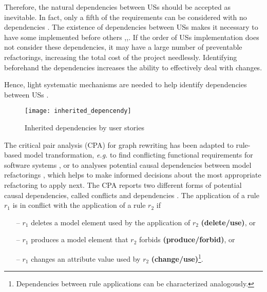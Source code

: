 Therefore, the natural dependencies between USs should be accepted as inevitable. In fact, only a fifth of the requirements can be considered with no dependencies \cite{carlshamre2001industrial}. The existence of dependencies between USs makes it necessary to have some implemented before others \cite{carlshamre2001industrial},\cite{Greer2004},\cite{logue2008handling}. If the order of USs implementation does not consider these dependencies, it may have a large number of preventable refactorings, increasing the total cost of the project needlessly. Identifying beforehand the dependencies increases the ability to effectively deal with changes. 

Hence, light systematic mechanisms are needed to help identify dependencies between USs \cite{gomez2010systematic}.
\begin{figure}
\center
\texttt{[image: inherited\_depencendy]}
\caption{  Inherited dependencies by user stories\cite{gomez2010systematic} }\label{fig:inherited_dependencies}
\end{figure}
The critical pair analysis (CPA) for graph rewriting \cite{hartmanis2006monographs} has been adapted to rule-based model transformation, \emph{e.g.} to find conflicting functional requirements for software systems \cite{hausmann2002detection}, or to analyses potential causal dependencies between model refactorings \cite{mens2007analysing}, which helps to make informed decisions about the most appropriate refactoring to apply next. The CPA reports two different forms of potential causal dependencies, called conflicts and dependencies \cite{born2015analyzing}.
The application of a rule $r_1$ is in conflict with the application of a rule $r_2$ if
\begin{itemize}
\item[--] $r_1$ deletes a model element used by the application of $r_2$ \textbf{(delete/use)}, or
\item[--] $r_1$ produces a model element that $r_2$ forbids \textbf{(produce/forbid)}, or
\item[--] $r_1$ changes an attribute value used by $r_2$ \textbf{(change/use)}\footnote{Dependencies between rule applications can be characterized analogously.}. 
\end{itemize}
